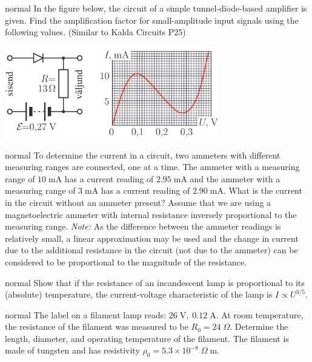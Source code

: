 \hypertarget{P40}{}
\begin{solution}{normal} %
In the figure below, the circuit of a simple tunnel-diode-based amplifier is given. Find the amplification factor for small-amplitude input signals using the following values. (Similar to Kalda Circuits P25)
\begin{center}
    \includegraphics[width=0.7\textwidth]{S1 Figures/S1-40.png}
\end{center}
\end{solution}

\hypertarget{P41}{}
\begin{solution}{normal} %
To determine the current in a circuit, two ammeters with different measuring ranges are connected, one at a time. The ammeter with a measuring range of $10\;\text{mA}$ has a current reading of $2.95\;\text{mA}$ and the ammeter with a measuring range of $3\;\text{mA}$ has a current reading of $2.90\;\text{mA}$. What is the current in the circuit without an ammeter present? Assume that we are using a magnetoelectric ammeter with internal resistance inversely proportional to the measuring range. \textit{Note:} As the difference between the ammeter readings is relatively small, a linear approximation may be used and the change in current due to the additional resistance in the circuit (not due to the ammeter) can be considered to be proportional to the magnitude of the resistance.
\end{solution}

\hypertarget{P42}{}
\begin{solution}{normal} %
Show that if the resistance of an incandescent lamp is proportional to its (absolute) temperature, the current-voltage characteristic of the lamp is $I\propto U^{3/5}$.
\end{solution}

\hypertarget{P43}{}
\begin{solution}{normal} %
The label on a filament lamp  reads: $26\;\text{V},\;0.12\;\text{A}$. At room temperature, the resistance of the filament was measured to be $R_0=24\;\Omega$. Determine the length, diameter, and operating temperature of the filament. The filament is made of tungsten and has resistivity $\rho_0=5.3\times10^{-8}\;\Omega\;\text{m}$.
\end{solution}

